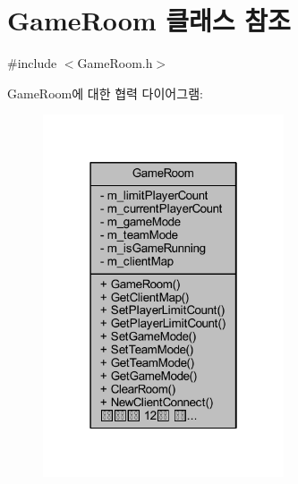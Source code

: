 \hypertarget{class_game_room}{}\section{Game\+Room 클래스 참조}
\label{class_game_room}


{\ttfamily \#include $<$Game\+Room.\+h$>$}



Game\+Room에 대한 협력 다이어그램\+:
\nopagebreak
\begin{figure}[H]
\begin{center}
\leavevmode
\includegraphics[width=202pt]{class_game_room__coll__graph}
\end{center}
\end{figure}
